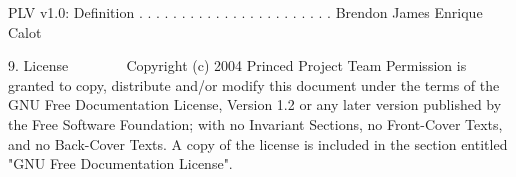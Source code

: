 PLV v1.0:
  Definition . . . . . . . . . . . . . . . . . . . . . . .  Brendon James
                                                            Enrique Calot

9. License
   ~~~~~~~
      Copyright (c)  2004  Princed Project Team
      Permission is granted to copy, distribute and/or modify this document
      under the terms of the GNU Free Documentation License, Version 1.2
      or any later version published by the Free Software Foundation;
      with no Invariant Sections, no Front-Cover Texts, and no Back-Cover
      Texts.  A copy of the license is included in the section entitled
      "GNU Free Documentation License".

